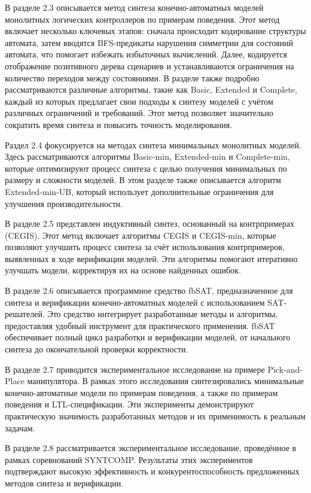 В разделе 2.3 описывается метод синтеза конечно-автоматных моделей монолитных логических контроллеров по примерам поведения. Этот метод включает несколько ключевых этапов: сначала происходит кодирование структуры автомата, затем вводятся BFS-предикаты нарушения симметрии для состояний автомата, что помогает избежать избыточных вычислений. Далее, кодируется отображение позитивного дерева сценариев и устанавливаются ограничения на количество переходов между состояниями. В разделе также подробно рассматриваются различные алгоритмы, такие как Basic, Extended и Complete, каждый из которых предлагает свои подходы к синтезу моделей с учётом различных ограничений и требований. Этот метод позволяет значительно сократить время синтеза и повысить точность моделирования.

Раздел 2.4 фокусируется на методах синтеза минимальных монолитных моделей. Здесь рассматриваются алгоритмы Basic-min, Extended-min и Complete-min, которые оптимизируют процесс синтеза с целью получения минимальных по размеру и сложности моделей. В этом разделе также описывается алгоритм Extended-min-UB, который использует дополнительные ограничения для улучшения производительности.

В разделе 2.5 представлен индуктивный синтез, основанный на контрпримерах (CEGIS). Этот метод включает алгоритмы CEGIS и CEGIS-min, которые позволяют улучшить процесс синтеза за счёт использования контрпримеров, выявленных в ходе верификации моделей. Эти алгоритмы помогают итеративно улучшать модели, корректируя их на основе найденных ошибок.

В разделе 2.6 описывается программное средство fbSAT, предназначенное для синтеза и верификации конечно-автоматных моделей с использованием SAT-решателей. Это средство интегрирует разработанные методы и алгоритмы, предоставляя удобный инструмент для практического применения. fbSAT обеспечивает полный цикл разработки и верификации моделей, от начального синтеза до окончательной проверки корректности.

В разделе 2.7 приводится экспериментальное исследование на примере Pick-and-Place манипулятора. В рамках этого исследования синтезировались минимальные конечно-автоматные модели по примерам поведения, а также по примерам поведения и LTL-спецификации. Эти эксперименты демонстрируют практическую значимость разработанных методов и их применимость к реальным задачам.

В разделе 2.8 рассматривается экспериментальное исследование, проведённое в рамках соревнований SYNTCOMP. Результаты этих экспериментов подтверждают высокую эффективность и конкурентоспособность предложенных методов синтеза и верификации.


